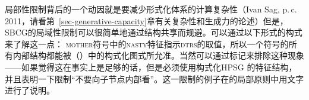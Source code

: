局部性限制背后的一个动因就是要减少形式化体系的计算复杂性（Ivan Sag, p.\,c.\,2011，请看第~\ref{sec-generative-capacity}章有关复杂性和生成力的论述）但是，SBCG的局域性限制可以很简单地通过结构共享而规避\citep[\S~9.6.1]{MuellerGTBuch2}。可以通过以下形式的构式来了解这一点：
\ea
{}
\z
\textsc{mother}符号中的\textsc{nasty}特征指示\textsc{dtrs}的取值，所以一个符号的所有内部结构都能被（）中的构式化图式所允准。当然可以通过标记来排除这种现象——如果觉得这在事实上是足够的话，但是必须使用构式化HPSG \citep{Sag97a}的特征结构，并且表明一下限制“不要向子节点内部看”。这一限制的例子在\citet[--144]{ps}的局部原则中用文字进行了说明。


